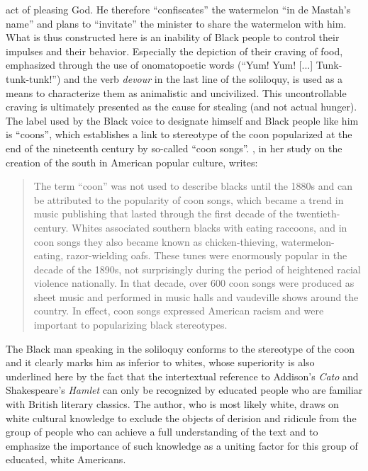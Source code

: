 act of pleasing God. He therefore “confiscates” the watermelon “in de Mastah’s name” and plans to “invitate” the minister to share the watermelon with him. What is thus constructed here is an inability of Black people to control their impulses and their behavior. Especially the depiction of their craving of food, emphasized through the use of onomatopoetic words (“Yum! Yum! [...] Tunk-tunk-tunk!”) and the verb \emph{devour} in the last line of the soliloquy, is used as a means to characterize them as animalistic and uncivilized. This uncontrollable craving is ultimately presented as the cause for stealing (and not actual hunger). The label used by the Black voice to designate himself and Black people like him is “coons”, which establishes a link to stereotype of the coon popularized at the end of the nineteenth century by so-called “coon songs”. \citet[15]{Cox2011}, in her study on the creation of the south in American popular culture, writes:

\begin{quote}
The term “coon” was not used to describe blacks until the 1880s and can be attributed to the popularity of coon songs, which became a trend in music publishing that lasted through the first decade of the twentieth-century. Whites associated southern blacks with eating raccoons, and in coon songs they also became known as chicken-thieving, watermelon-eating, razor-wielding oafs. These tunes were enormously popular in the decade of the 1890s, not surprisingly during the period of heightened racial violence nationally. In that decade, over 600 coon songs were produced as sheet music and performed in music halls and vaudeville shows around the country. In effect, coon songs expressed American racism and were important to popularizing black stereotypes.
\end{quote}

The Black man speaking in the soliloquy conforms to the stereotype of the coon and it clearly marks him as inferior to whites, whose superiority is also underlined here by the fact that the intertextual reference to Addison’s \emph{Cato} and Shakespeare’s \emph{Hamlet} can only be recognized by educated people who are familiar with British literary classics. The author, who is most likely white, draws on white cultural knowledge to exclude the objects of derision and ridicule from the group of people who can achieve a full understanding of the text and to emphasize the importance of such knowledge as a uniting factor for this group of educated, white Americans.

